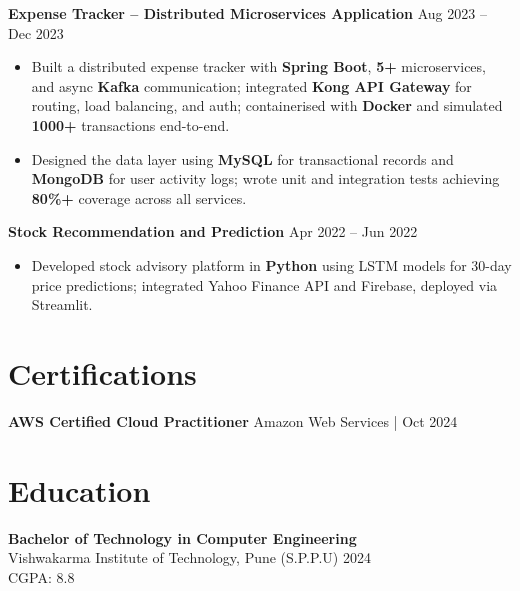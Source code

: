 \documentclass[a4paper,10pt]{article}
\begin{document}
\textbf{Expense Tracker -- Distributed Microservices Application} \hfill Aug 2023 -- Dec 2023
\begin{itemize}[leftmargin=*]
    \item Built a distributed expense tracker with \textbf{Spring Boot}, \textbf{5+} microservices, and async \textbf{Kafka} communication; integrated \textbf{Kong API Gateway} for routing, load balancing, and auth; containerised with \textbf{Docker} and simulated \textbf{1000+} transactions end-to-end.
    \item Designed the data layer using \textbf{MySQL} for transactional records and \textbf{MongoDB} for user activity logs; wrote unit and integration tests achieving \textbf{80\%+} coverage across all services.
\end{itemize}
\textbf{Stock Recommendation and Prediction} \hfill Apr 2022 -- Jun 2022
\begin{itemize}[leftmargin=*]
    \item Developed stock advisory platform in \textbf{Python} using LSTM models for 30-day price predictions; integrated Yahoo Finance API and Firebase, deployed via Streamlit.
\end{itemize}

\section*{Certifications}
\textbf{AWS Certified Cloud Practitioner} \hfill Amazon Web Services \;|\; Oct 2024 \\

\section*{Education}

\textbf{Bachelor of Technology in Computer Engineering} \\
Vishwakarma Institute of Technology, Pune (S.P.P.U) \hfill 2024 \\
CGPA: 8.8
\end{document}
